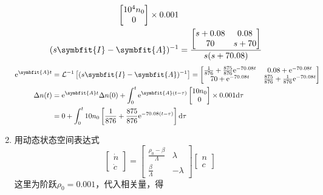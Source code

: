 \begin{exercise}
\begin{enumerate}
\begin{align*}
\begin{bmatrix}
                10^4 n_0 \\
                0
            \end{bmatrix} \times 0.001 \\
            (s\symbfit{I} - \symbfit{A})^{-1} &= \frac{\begin{bmatrix}
                s+0.08 & 0.08 \\
                70 & s+70
            \end{bmatrix}}{s(s+70.08)}
        \end{align*}
        \begin{align*}
            {\rm e}^{\symbfit{A}t} &= \mathcal{L}^{-1}\left[(s\symbfit{I} - \symbfit{A})^{-1}\right] = \begin{bmatrix}
                \frac{1}{876}+\frac{875}{876}{\rm e}^{-70.08t} & 0.08+{\rm e}^{-70.08t} \\
                70+{\rm e}^{-70.08t} & \frac{875}{876}+\frac{1}{876}{\rm e}^{-70.08t}
            \end{bmatrix} \\
            \Delta n(t) &= {\rm e}^{\symbfit{A}t} \Delta n(0) + \int_{0}^{t} {\rm e}^{\symbfit{A}(t-\tau)} \begin{bmatrix}
                10n_0 \\
                0
            \end{bmatrix} \times 0.001 {\rm d}\tau \\
            &= 0 + \int_{0}^{t} 10n_0\left[\frac{1}{876}+\frac{875}{876}{\rm e}^{-70.08(t-\tau)}\right] {\rm d}\tau
        \end{align*}
        \item 用动态状态空间表达式
        \begin{equation*}
            \begin{bmatrix}
                \dot{n} \\
                \dot{c}
            \end{bmatrix} = \begin{bmatrix}
                \frac{\rho_0 - \beta}{\varLambda} & \lambda \\
                \frac{\beta}{\varLambda} & -\lambda
            \end{bmatrix} \begin{bmatrix}
                n \\
                c
            \end{bmatrix}
        \end{equation*}
        这里为阶跃$\rho_0 = 0.001$，代入相关量，得

\end{enumerate}
\end{exercise}
